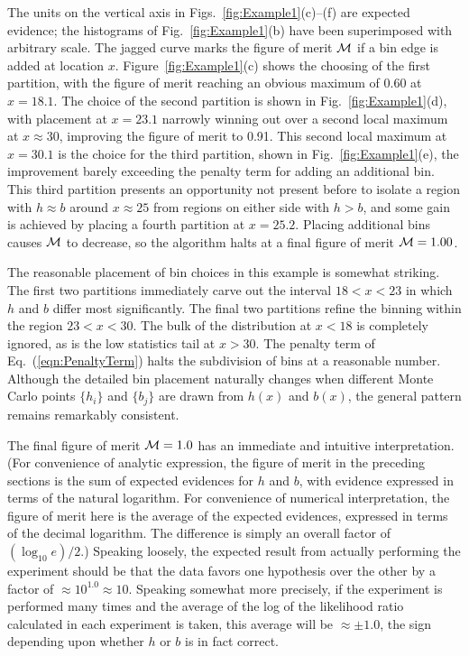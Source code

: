 \documentclass[twocolumn,twoside,prd]{revtex4} %
\begin{document}
The units on the vertical axis in Figs.~\ref{fig:Example1}(c)--(f) are expected evidence; the histograms of Fig.~\ref{fig:Example1}(b) have been superimposed with arbitrary scale.  The jagged curve marks the figure of merit ${\cal M}$ if a bin edge is added at location $x$.  Figure~\ref{fig:Example1}(c) shows the choosing of the first partition, with the figure of merit reaching an obvious maximum of 0.60 at $x=18.1$.  The choice of the second partition is shown in Fig.~\ref{fig:Example1}(d), with placement at $x=23.1$ narrowly winning out over a second local maximum at $x\approx 30$, improving the figure of merit to 0.91.  This second local maximum at $x=30.1$ is the choice for the third partition, shown in Fig.~\ref{fig:Example1}(e), the improvement barely exceeding the penalty term for adding an additional bin.  This third partition presents an opportunity not present before to isolate a region with $h\approx b$ around $x\approx 25$ from regions on either side with $h > b$, and some gain is achieved by placing a fourth partition at $x=25.2$.  Placing additional bins causes ${\cal M}$ to decrease, so the algorithm halts at a final figure of merit ${\cal M} = 1.00$.

The reasonable placement of bin choices in this example is somewhat striking.  The first two partitions immediately carve out the interval $18 < x < 23$ in which $h$ and $b$ differ most significantly.  The final two partitions refine the binning within the region $23<x<30$.   The bulk of the distribution at $x<18$ is completely ignored, as is the low statistics tail at $x>30$.  The penalty term of Eq.~(\ref{eqn:PenaltyTerm}) halts the subdivision of bins at a reasonable number.  Although the detailed bin placement naturally changes when different Monte Carlo points $\{ h_i \}$ and $\{ b_j \}$ are drawn from $h(x)$ and $b(x)$, the general pattern remains remarkably consistent.

The final figure of merit ${\cal M} = 1.0$ has an immediate and intuitive interpretation.  (For convenience of analytic expression, the figure of merit in the preceding sections is the sum of expected evidences for $h$ and $b$, with evidence expressed in terms of the natural logarithm.  For convenience of numerical interpretation, the figure of merit here is the average of the expected evidences, expressed in terms of the decimal logarithm.  The difference is simply an overall factor of $(\log_{10}{e})/2$.)  Speaking loosely, the expected result from actually performing the experiment should be that the data favors one hypothesis over the other by a factor of $\approx 10^{1.0} \approx 10$.  Speaking somewhat more precisely, if the experiment is performed many times and the average of the log of the likelihood ratio calculated in each experiment is taken, this average will be $\approx \pm 1.0$, the sign depending upon whether $h$ or $b$ is in fact correct.
\end{document}

